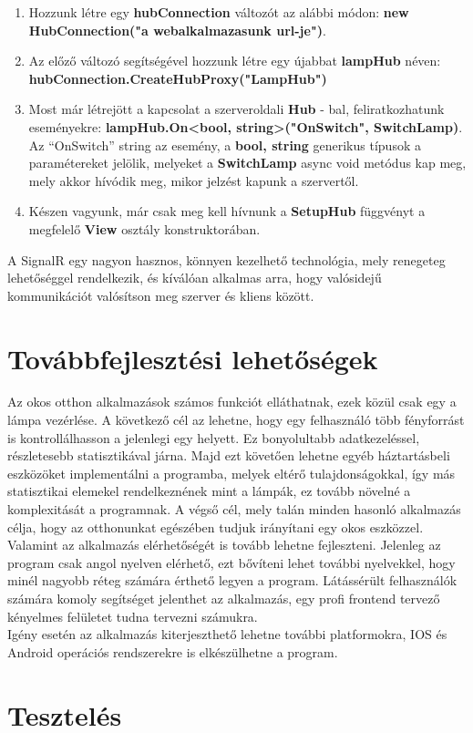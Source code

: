 \documentclass[a4paper,12pt]{report}
\begin{document}
\begin{enumerate}
    \item Hozzunk létre egy \textbf{hubConnection} változót az alábbi módon: \textbf{new HubConnection("a webalkalmazasunk url-je")}.
    \item Az előző változó segítségével hozzunk létre egy újabbat \textbf{lampHub} néven: \textbf{hubConnection.CreateHubProxy("LampHub")}
    \item Most már létrejött a kapcsolat a szerveroldali \textbf{Hub} - bal, feliratkozhatunk eseményekre: \textbf{lampHub.On<bool, string>("OnSwitch", SwitchLamp)}.
    Az ``OnSwitch'' string az esemény, a \textbf{bool, string} generikus típusok a paramétereket jelölik, melyeket a \textbf{SwitchLamp}
    async void metódus kap meg, mely akkor hívódik meg, mikor jelzést kapunk a szervertől.
    \item Készen vagyunk, már csak meg kell hívnunk a \textbf{SetupHub} függvényt a megfelelő \textbf{View} osztály konstruktorában.
\end{enumerate}

    A SignalR egy nagyon hasznos, könnyen kezelhető technológia, mely renegeteg lehetőséggel rendelkezik, és kíválóan alkalmas
    arra, hogy valósidejű kommunikációt valósítson meg szerver és kliens között.

\section{Továbbfejlesztési lehetőségek}
    Az okos otthon alkalmazások számos funkciót elláthatnak, ezek közül csak egy a lámpa vezérlése. A következő cél az lehetne,
    hogy egy felhasználó több fényforrást is kontrollálhasson a jelenlegi egy helyett. Ez bonyolultabb adatkezeléssel, részletesebb statisztikával
    járna. Majd ezt követően lehetne egyéb háztartásbeli eszközöket implementálni a programba, melyek eltérő tulajdonságokkal, így
    más statisztikai elemekel rendelkeznének mint a lámpák, ez tovább növelné a komplexitását a programnak. A végső cél, mely
    talán minden hasonló alkalmazás célja, hogy az otthonunkat egészében tudjuk irányítani egy okos eszközzel.\\

    Valamint az alkalmazás elérhetőségét is tovább lehetne fejleszteni. Jelenleg az program csak angol nyelven elérhető, ezt bővíteni lehet
    további nyelvekkel, hogy minél nagyobb réteg számára érthető legyen a program. Látássérült felhasználók számára komoly segítséget jelenthet
    az alkalmazás, egy profi frontend tervező kényelmes felületet tudna tervezni számukra.\\

    Igény esetén az alkalmazás kiterjeszthető lehetne további platformokra, IOS és Android operációs rendszerekre is elkészülhetne
    a program.

\section{Tesztelés}
\end{document}
